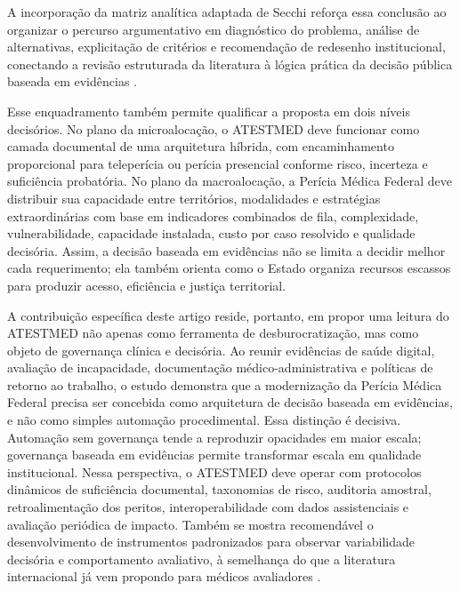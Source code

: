 \documentclass[12pt,a4paper]{article}
\begin{document}
A incorporação da matriz analítica adaptada de Secchi reforça essa conclusão ao organizar o percurso argumentativo em diagnóstico do problema, análise de alternativas, explicitação de critérios e recomendação de redesenho institucional, conectando a revisão estruturada da literatura à lógica prática da decisão pública baseada em evidências \parencite{secchi2020analisedepoliticaspublicas}.

Esse enquadramento também permite qualificar a proposta em dois níveis decisórios. No plano da microalocação, o ATESTMED deve funcionar como camada documental de uma arquitetura híbrida, com encaminhamento proporcional para teleperícia ou perícia presencial conforme risco, incerteza e suficiência probatória. No plano da macroalocação, a Perícia Médica Federal deve distribuir sua capacidade entre territórios, modalidades e estratégias extraordinárias com base em indicadores combinados de fila, complexidade, vulnerabilidade, capacidade instalada, custo por caso resolvido e qualidade decisória. Assim, a decisão baseada em evidências não se limita a decidir melhor cada requerimento; ela também orienta como o Estado organiza recursos escassos para produzir acesso, eficiência e justiça territorial.

A contribuição específica deste artigo reside, portanto, em propor uma leitura do ATESTMED não apenas como ferramenta de desburocratização, mas como objeto de governança clínica e decisória. Ao reunir evidências de saúde digital, avaliação de incapacidade, documentação médico-administrativa e políticas de retorno ao trabalho, o estudo demonstra que a modernização da Perícia Médica Federal precisa ser concebida como arquitetura de decisão baseada em evidências, e não como simples automação procedimental. Essa distinção é decisiva. Automação sem governança tende a reproduzir opacidades em maior escala; governança baseada em evidências permite transformar escala em qualidade institucional. Nessa perspectiva, o ATESTMED deve operar com protocolos dinâmicos de suficiência documental, taxonomias de risco, auditoria amostral, retroalimentação dos peritos, interoperabilidade com dados assistenciais e avaliação periódica de impacto. Também se mostra recomendável o desenvolvimento de instrumentos padronizados para observar variabilidade decisória e comportamento avaliativo, à semelhança do que a literatura internacional já vem propondo para médicos avaliadores \parencite{steenbeek2011thedevelopmentofinstrumentstomeasuretheworkdisa}.
\end{document}
